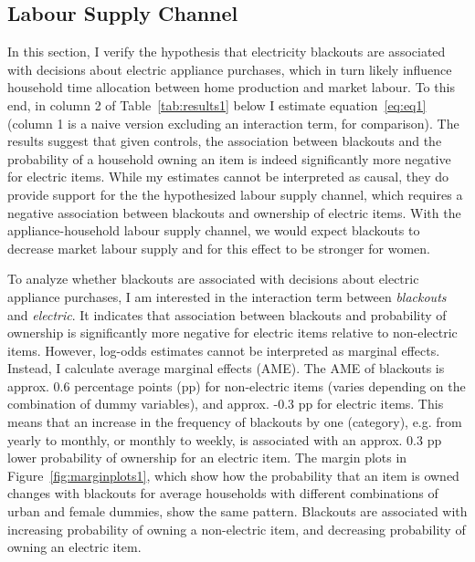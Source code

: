 \documentclass[12pt]{article}
\begin{document}
\subsection{Labour Supply Channel} \label{subsec:lsresults}
In this section, I verify the hypothesis that electricity blackouts are associated with decisions about electric appliance purchases, which in turn likely influence household time allocation between home production and market labour. To this end, in column 2 of Table~\ref{tab:results1} below I estimate equation~\ref{eq:eq1} (column 1 is a naive version excluding an interaction term, for comparison). The results suggest that given controls, the association between blackouts and the probability of a household owning an item is indeed significantly more negative for electric items. While my estimates cannot be interpreted as causal, they do provide support for the the hypothesized labour supply channel, which requires a negative association between blackouts and ownership of electric items. With the appliance-household labour supply channel, we
would expect blackouts to decrease market labour supply and for this effect to be stronger for women.
\par
To analyze whether blackouts are associated with decisions about electric appliance purchases, I am interested in the interaction term between \textit{blackouts} and \textit{electric}. It indicates that association between blackouts and probability of ownership is significantly more negative for electric items relative to non-electric items. However, log-odds estimates cannot be interpreted as marginal effects. Instead, I calculate average marginal effects (AME). The AME of blackouts is approx. 0.6 percentage points (pp) for non-electric items (varies depending on the combination of dummy variables), and approx. -0.3 pp for electric items. This means that an increase in the frequency of blackouts by one (category), e.g. from yearly to monthly, or monthly to weekly, is associated with an approx. 0.3 pp lower probability of ownership for an electric item. The margin plots in Figure~\ref{fig:marginplots1}, which show how the probability that an item is owned changes with blackouts for average households with different combinations of urban and female dummies, show the same pattern. Blackouts are associated with increasing probability of owning a non-electric item, and decreasing probability of owning an electric item.
\par
\end{document}
